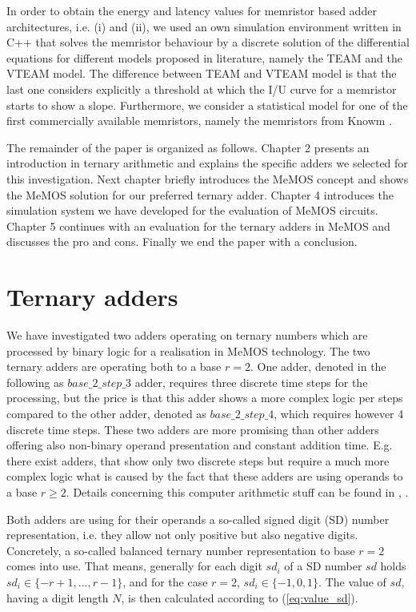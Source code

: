 \documentclass[pageno]{jpaper}
\begin{document}
In order to obtain the energy and latency values for memristor based adder architectures, i.e. (i) and (ii), we used an own simulation environment written in C++ that solves the memristor behaviour by a discrete solution of the differential equations for different models proposed in literature, namely the TEAM \cite{Kvatinsky_TEAM} and the VTEAM \cite{Kvatinsky_VTEAM} model. The difference between TEAM and VTEAM model is that the last one considers explicitly a threshold at which the I/U curve for a memristor starts to show a slope. Furthermore, we consider a statistical model for one of the first commercially available memristors, namely the memristors from Knowm \cite{Knowm}. 

The remainder of the paper is organized as follows. Chapter 2 presents an introduction in ternary arithmetic and explains the specific adders we selected for this investigation. Next chapter briefly introduces the MeMOS concept and shows the MeMOS solution for our preferred ternary adder. Chapter 4 introduces the simulation system we have developed for the evaluation of MeMOS circuits. Chapter 5 continues with an evaluation for the ternary adders in MeMOS and discusses the pro and cons. Finally we end the paper with a conclusion.     

\section{Ternary adders}

We have investigated two adders operating on ternary numbers which are processed by binary logic for a realisation in MeMOS technology. The two ternary adders are operating both to a base $r=2$. One adder, denoted in the following as $base\_2\_step\_3$ adder, requires three discrete time steps for the processing, but the price is that this adder shows a more complex logic per steps compared to the other adder, denoted as $base\_2\_step\_4$, which requires however 4 discrete time steps. These two adders are more promising than other adders offering also non-binary operand presentation and constant addition time. E.g. there exist adders, that show only two discrete steps but require a much more complex logic what is caused by the fact that these adders are using operands to a base $r \geq 2$. Details concerning this computer arithmetic stuff can be found in \cite{GonzalezM00}, \cite{MemSysPaper}.

Both adders are using for their operands a so-called signed digit (SD) number representation, i.e. they allow not only positive but also negative digits. Concretely, a so-called balanced ternary number representation to base $r=2$ comes into use. That means, generally for each digit $sd_i$ of a SD number $sd$ holds $sd_i \in \lbrace-r+1, ..., r-1\rbrace$, and for the case $r = 2$, $sd_i \in \lbrace-1,0,1\rbrace$. The value of $sd$, having a digit length $N$, is then calculated according to (\ref{eq:value_sd}). 
\end{document}
